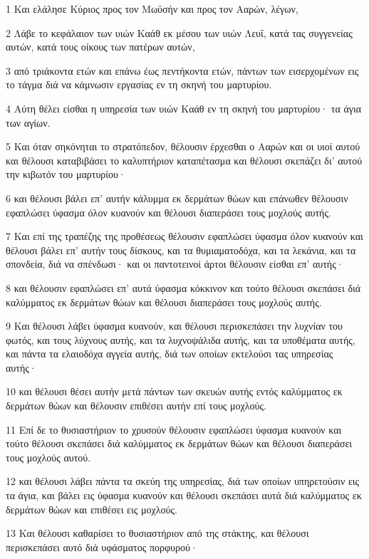 \par 1 Και ελάλησε Κύριος προς τον Μωϋσήν και προς τον Ααρών, λέγων,
\par 2 Λάβε το κεφάλαιον των υιών Καάθ εκ μέσου των υιών Λευΐ, κατά τας συγγενείας αυτών, κατά τους οίκους των πατέρων αυτών,
\par 3 από τριάκοντα ετών και επάνω έως πεντήκοντα ετών, πάντων των εισερχομένων εις το τάγμα διά να κάμνωσιν εργασίας εν τη σκηνή του μαρτυρίου.
\par 4 Αύτη θέλει είσθαι η υπηρεσία των υιών Καάθ εν τη σκηνή του μαρτυρίου· τα άγια των αγίων.
\par 5 Και όταν σηκόνηται το στρατόπεδον, θέλουσιν έρχεσθαι ο Ααρών και οι υιοί αυτού και θέλουσι καταβιβάσει το καλυπτήριον καταπέτασμα και θέλουσι σκεπάζει δι' αυτού την κιβωτόν του μαρτυρίου·
\par 6 και θέλουσι βάλει επ' αυτήν κάλυμμα εκ δερμάτων θώων και επάνωθεν θέλουσιν εφαπλώσει ύφασμα όλον κυανούν και θέλουσι διαπεράσει τους μοχλούς αυτής.
\par 7 Και επί της τραπέζης της προθέσεως θέλουσιν εφαπλώσει ύφασμα όλον κυανούν και θέλουσι βάλει επ' αυτήν τους δίσκους, και τα θυμιαματοδόχα, και τα λεκάνια, και τα σπονδεία, διά να σπένδωσι· και οι παντοτεινοί άρτοι θέλουσιν είσθαι επ' αυτής·
\par 8 και θέλουσιν εφαπλώσει επ' αυτά ύφασμα κόκκινον και τούτο θέλουσι σκεπάσει διά καλύμματος εκ δερμάτων θώων και θέλουσι διαπεράσει τους μοχλούς αυτής.
\par 9 Και θέλουσι λάβει ύφασμα κυανούν, και θέλουσι περισκεπάσει την λυχνίαν του φωτός, και τους λύχνους αυτής, και τα λυχνοψάλιδα αυτής, και τα υποθέματα αυτής, και πάντα τα ελαιοδόχα αγγεία αυτής, διά των οποίων εκτελούσι τας υπηρεσίας αυτής·
\par 10 και θέλουσι θέσει αυτήν μετά πάντων των σκευών αυτής εντός καλύμματος εκ δερμάτων θώων και θέλουσιν επιθέσει αυτήν επί τους μοχλούς.
\par 11 Επί δε το θυσιαστήριον το χρυσούν θέλουσιν εφαπλώσει ύφασμα κυανούν και τούτο θέλουσι σκεπάσει διά καλύμματος εκ δερμάτων θώων και θέλουσι διαπεράσει τους μοχλούς αυτού.
\par 12 και θέλουσι λάβει πάντα τα σκεύη της υπηρεσίας, διά των οποίων υπηρετούσιν εις τα άγια, και βάλει εις ύφασμα κυανούν και θέλουσι σκεπάσει αυτά διά καλύμματος εκ δερμάτων θώων και επιθέσει εις μοχλούς.
\par 13 Και θέλουσι καθαρίσει το θυσιαστήριον από της στάκτης, και θέλουσι περισκεπάσει αυτό διά υφάσματος πορφυρού·
